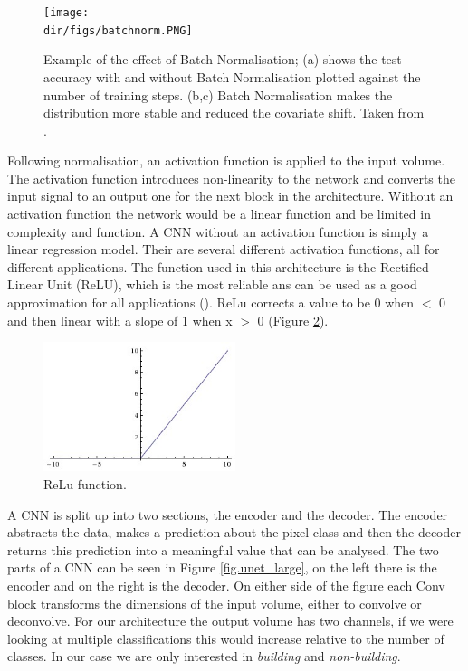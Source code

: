 \begin{figure}[htpb]
    \centering
    \texttt{[image: \\dir/figs/batchnorm.PNG]}
    \caption[Example of the effect of Batch Normalisation]{Example of the effect of Batch Normalisation; (a) shows the test accuracy with and without Batch Normalisation plotted against the number of training steps. (b,c) Batch Normalisation makes the distribution more stable and reduced the covariate shift. Taken from \citet{ioffe15}.}
    \label{fig.batchnorm}
\end{figure}

Following normalisation, an activation function is applied to the input volume. The activation function introduces non-linearity to the network and converts the input signal to an output one for the next block in the architecture. Without an activation function the network would be a linear function and be limited in complexity and function. A CNN without an activation function is simply a linear regression model. Their are several different activation functions, all for different applications. The function used in this architecture is the Rectified Linear Unit (ReLU), which is the most reliable ans can be used as a good approximation for all applications (\cite{krizhevsky17}). ReLu corrects a value to be 0 when $<$ 0 and then linear with a slope of 1 when x $>$ 0 (Figure \ref{fig.reluA}). 
\par

\begin{figure}[htpb]
    \centering
    \includegraphics[width=0.5\textwidth]{Part2/chapter3/chapter/figs/relu.jpeg}
    \caption{ReLu function.}
    \label{fig.reluA}
\end{figure}

A CNN is split up into two sections, the encoder and the decoder. The encoder abstracts the data, makes a prediction about the pixel class and then the decoder returns this prediction into a meaningful value that can be analysed. The two parts of a CNN can be seen in Figure \ref{fig.unet_large}, on the left there is the encoder and on the right is the decoder. On either side of the figure each Conv block transforms the dimensions of the input volume, either to convolve or deconvolve. For our architecture the output volume has two channels, if we were looking at multiple classifications this would increase relative to the number of classes. In our case we are only interested in \textit{building} and \textit{non-building}. 

